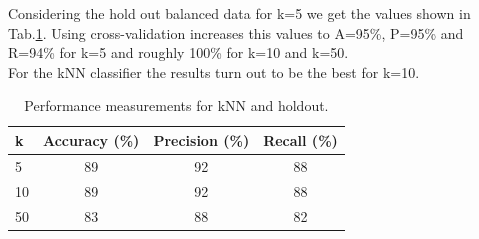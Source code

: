 \documentclass{article}
\begin{document}
Considering the hold out balanced data for k=5 we get the values shown in Tab.\ref{tab:perf_kNN_breast}. Using cross-validation increases this values to A=95\%, P=95\% and R=94\% for k=5 and roughly 100\% for k=10 and k=50. \\
For the kNN classifier the results turn out to be the best for k=10.

\begin{table}[h!]
		\centering
    \begin{tabular}{ l c c c }
        \toprule
        \textbf{k} & \textbf{Accuracy (\%)} & \textbf{Precision (\%)} & \textbf{Recall (\%)} \\
        \toprule
				5 & 89 & 92 & 88 \\
				10 & 89 & 92 & 88 \\
				50 & 83 & 88 & 82 \\
        \bottomrule
    \end{tabular}
		\caption{Performance measurements for kNN and holdout.}
		\label{tab:perf_kNN_breast}
\end{table}
\end{document}
